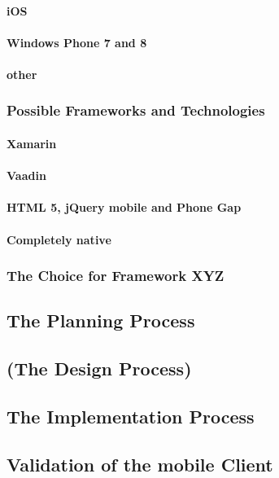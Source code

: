 \paragraph{iOS}
\paragraph{Windows Phone 7 and 8}
\paragraph{other}
\subsubsection{Possible Frameworks and Technologies}
\paragraph{Xamarin}
\paragraph{Vaadin}
\paragraph{HTML 5, jQuery mobile and Phone Gap}
\paragraph{Completely native}
\subsubsection{The Choice for Framework XYZ}
\subsection{The Planning Process}
\subsection{(The Design Process)}
\subsection{The Implementation Process}
\subsection{Validation of the mobile Client}